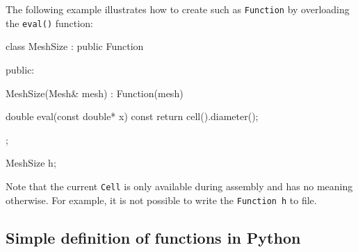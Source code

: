 The following example illustrates how to create such as
\texttt{Function} by overloading the \texttt{eval()} function:
\begin{code}
class MeshSize : public Function
{
public:

  MeshSize(Mesh& mesh) : Function(mesh) {}

  double eval(const double* x) const
  {
    return cell().diameter();
  }
    
};

MeshSize h;
\end{code}

Note that the current \texttt{Cell} is only available during assembly
and has no meaning otherwise. For example, it is not possible to write the
\texttt{Function}~\texttt{h} to file.


\subsection{Simple definition of functions in Python}


